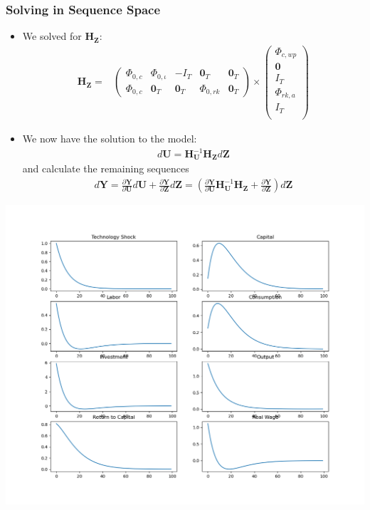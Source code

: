 \documentclass[english,xcolor=svgnames]{beamer}
\begin{document}
\begin{frame}
    \frametitle{Solving in Sequence Space}
		\begin{itemize}
			\item We solved for $\mathbf{H}_{\mathbf{Z}}$:
			\begin{align*}
				\mathbf{H}_{\mathbf{Z}} =&\begin{pmatrix}
					\Phi_{0,c} & \Phi_{0,\iota} & - I_T & \mathbf{0}_T & \mathbf{0}_T \\ 
					\Phi_{0,c} & \mathbf{0}_T & \mathbf{0}_T & \Phi_{0,rk} & \mathbf{0}_T  
				\end{pmatrix}  \times \begin{pmatrix}
					\Phi_{c,wp} \\ 
					\mathbf{0}  \\
					I_T  \\
					\Phi_{rk,a}  \\
					I_T  \\
				\end{pmatrix}
			\end{align*}
			\item We now have the solution to the model:
				\begin{align*}
					d\mathbf{U} = \mathbf{H}_{\mathbf{U}}^{-1}\mathbf{H}_{\mathbf{Z}}d\mathbf{Z}
				\end{align*}
				and calculate the remaining sequences
				\begin{align*}
					d\mathbf{Y} = \frac{\partial \mathbf{Y}}{\partial \mathbf{U}}d\mathbf{U} +  \frac{\partial \mathbf{Y}}{\partial \mathbf{Z}}d\mathbf{Z} = (\frac{\partial \mathbf{Y}}{\partial \mathbf{U}}\mathbf{H}_{\mathbf{U}}^{-1}\mathbf{H}_{\mathbf{Z}} +  \frac{\partial \mathbf{Y}}{\partial \mathbf{Z}})d\mathbf{Z}
				\end{align*}
		\end{itemize}
\end{frame}




\begin{frame}
	\vspace{-0.5cm}
		\includegraphics[scale=0.4]{IRFs.png}
\end{frame}
\end{document}
